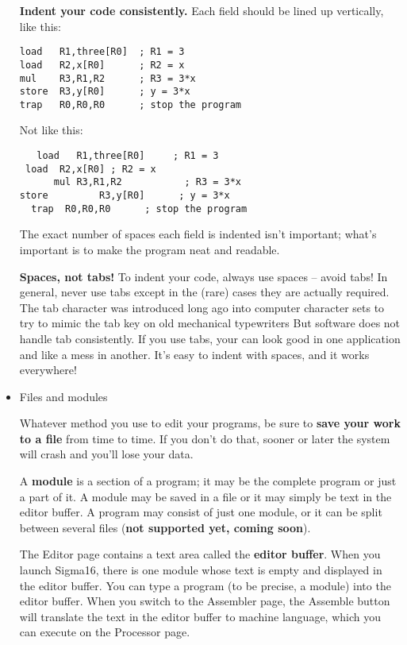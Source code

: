 \documentclass[11pt]{article}
\begin{document}
\begin{itemize}
\textbf{Indent your code consistently.} Each field should be lined up
vertically, like this:

\begin{verbatim}
load   R1,three[R0]  ; R1 = 3
load   R2,x[R0]      ; R2 = x
mul    R3,R1,R2      ; R3 = 3*x
store  R3,y[R0]      ; y = 3*x
trap   R0,R0,R0      ; stop the program
\end{verbatim}

Not like this:

\begin{verbatim}
   load   R1,three[R0]     ; R1 = 3
 load  R2,x[R0] ; R2 = x
      mul R3,R1,R2           ; R3 = 3*x
store         R3,y[R0]      ; y = 3*x
  trap  R0,R0,R0      ; stop the program
\end{verbatim}

The exact number of spaces each field is indented isn't important;
what's important is to make the program neat and readable.

\textbf{Spaces, not tabs!} To indent your code, always use spaces -- avoid
tabs!  In general, never use tabs except in the (rare) cases they are
actually required.  The tab character was introduced long ago into
computer character sets to try to mimic the tab key on old mechanical
typewriters But software does not handle tab consistently.  If you use
tabs, your can look good in one application and like a mess in
another.  It's easy to indent with spaces, and it works everywhere!

\item Files and modules
\label{sec:orgee2701e}

Whatever method you use to edit your programs, be sure to \textbf{\textbf{save your
work to a file}} from time to time.  If you don't do that, sooner or
later the system will crash and you'll lose your data.

A \textbf{module} is a section of a program; it may be the complete program
or just a part of it.  A module may be saved in a file or it may
simply be text in the editor buffer.  A program may consist of just
one module, or it can be split between several files (\textbf{not supported
yet, coming soon}).

The Editor page contains a text area called the \textbf{editor buffer}.  When
you launch Sigma16, there is one module whose text is empty and
displayed in the editor buffer.  You can type a program (to be
precise, a module) into the editor buffer.  When you switch to the
Assembler page, the Assemble button will translate the text in the
editor buffer to machine language, which you can execute on the
Processor page.


\end{itemize}
\end{document}
